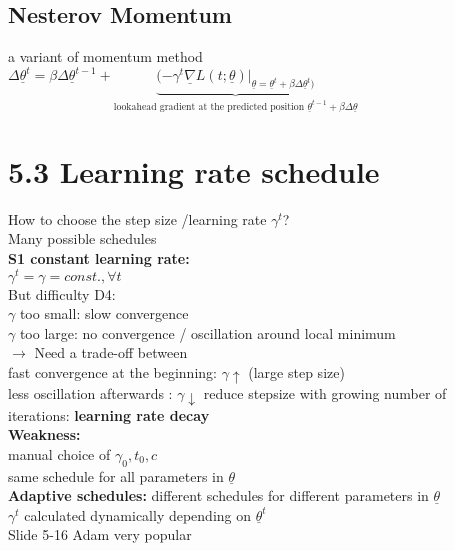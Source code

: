 \subsection{Nesterov Momentum}
a variant of momentum method \\
$  \Delta \underline{\theta} ^{t} =\beta \Delta \underline{\theta}^{t-1} +  \underbrace{(- \gamma^t \underline{ \nabla} L(t; \underline{\theta})|_{ \underline{\theta} = \underline{\theta}^t + \beta \Delta \underline{\theta}^t)}}_{\text{lookahead gradient at the predicted position } \underline{\theta}^{t-1} + \beta \Delta \underline{\theta}} $ 
\section{5.3 Learning rate schedule}
How to choose the step size /learning rate $  \gamma^t $?\\
Many possible schedules \\
\textbf{S1 constant learning rate:}\\
$ \gamma^t = \gamma = const., \forall t $\\
But difficulty D4: \\
\textbullet $  \gamma $ too small: slow convergence \\
\textbullet $  \gamma $ too large: no convergence / oscillation around local minimum\\
$\rightarrow$ Need a trade-off between \\
\textbullet fast convergence at the beginning: $  \gamma \uparrow $ (large step size) \\
\textbullet less oscillation afterwards : $  \gamma \downarrow $ reduce stepsize with growing number of iterations: \textbf{learning rate decay} \\
\textbf{Weakness:}\\
\textbullet manual choice of $ \gamma_0, t_0 , c $\\
\textbullet same schedule for all parameters in $ \underline{\theta} $ \\
\textbf{Adaptive schedules:}
\textbullet different schedules for different parameters in $  \underline{\theta} $\\
\textbullet $ \gamma^t  $ calculated dynamically depending on $ \underline{\theta}^t $ \\
Slide 5-16 Adam very popular \\
